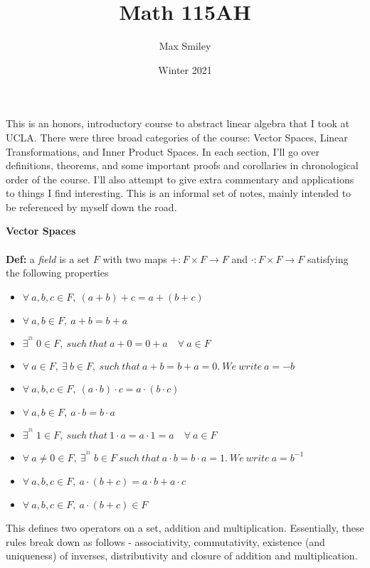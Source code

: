 \documentclass[12pt]{article}
\begin{document}
\title{Math 115AH}
\author{Max Smiley}
\date{Winter 2021}
\maketitle
This is an honors, introductory course to abstract linear algebra that I took at UCLA. There were three broad categories of the course: Vector Spaces, Linear Transformations, and Inner Product Spaces. In each section, I'll go over definitions, theorems, and some important proofs and corollaries in chronological order of the course. I'll also attempt to give extra commentary and applications to things I find interesting. This is an informal set of notes, mainly intended to be referenced by myself down the road.
\clearpage

\textbf{\Large Vector Spaces}
\\\\
\textbf{Def: }a \emph{field} is a set $F$ with two maps $+: F \times F \rightarrow F$ and $\cdot: F \times F \rightarrow F$ satisfying the following properties\\

\begin{itemize}
\item $\forall\ a, b, c \in F,\ (a + b) + c = a + (b + c)$
\item $\forall\ a, b \in F,\ a + b = b + a$
\item $\exists ^^21 \ 0 \in F,\ such\ that\ a + 0 = 0 + a\quad \forall\ a \in F$
\item $\forall\ a \in F,\ \exists\ b \in F,\ such\ that\ a + b = b + a = 0.\ We\ write\ a = -b$
\item $\forall\ a,b,c \in F,\ (a \cdot b) \cdot c = a \cdot (b \cdot c)$
\item $\forall\ a,b \in F,\ a \cdot b = b \cdot a$
\item $\exists ^^21 \ 1 \in F,\ such\ that\ 1 \cdot a = a \cdot 1 = a \quad \forall\ a \in F$
\item $\forall\ a \neq 0\in F,\ \exists ^^21\ b\in F\ such\ that\ a \cdot b = b \cdot a = 1.\ We\ write\ a = b^{-1}$
\item $\forall\ a,b,c \in F,\ a \cdot (b + c) = a \cdot b + a \cdot c$
\item $\forall\ a,b,c \in F,\ a \cdot (b + c) \in F$
\end{itemize}

This defines two operators on a set, addition and multiplication. Essentially, these rules break down as follows - associativity, commutativity, existence (and uniqueness) of inverses, distributivity and closure of addition and multiplication.\\
\end{document}
